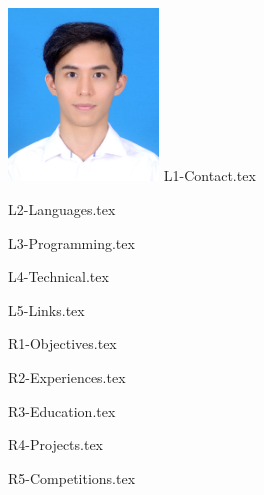 \documentclass[English]{cv-style}
\begin{document}
\lastupdated

\begin{aside}
\includegraphics[width=4cm]{mypicture.png}
{L1-Contact.tex}

{L2-Languages.tex}

{L3-Programming.tex}

{L4-Technical.tex}

{L5-Links.tex}
\end{aside}
{R1-Objectives.tex}

{R2-Experiences.tex}

{R3-Education.tex}

{R4-Projects.tex}

{R5-Competitions.tex}
\end{document}
